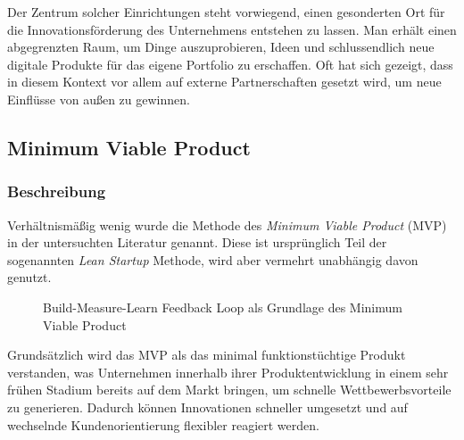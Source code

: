 Der Zentrum solcher Einrichtungen steht vorwiegend, einen gesonderten Ort für die Innovationsförderung des Unternehmens entstehen zu lassen. Man erhält einen abgegrenzten Raum, um Dinge auszuprobieren, Ideen und schlussendlich neue digitale Produkte für das eigene Portfolio zu erschaffen. Oft hat sich gezeigt, dass in diesem Kontext vor allem auf externe Partnerschaften gesetzt wird, um neue Einflüsse von außen zu gewinnen. 

\subsection{Minimum Viable Product}

\subsubsection{Beschreibung}

Verhältnismäßig wenig wurde die Methode des \textit{Minimum Viable Product} (MVP) in der untersuchten Literatur genannt. Diese ist ursprünglich Teil der sogenannten \textit{Lean Startup} Methode, wird aber vermehrt unabhängig davon genutzt.

\begin{figure}[H]
	\centering
	\caption[Build-Measure-Learn Feedback Loop als Grundlage des Minimum Viable Product]{Build-Measure-Learn Feedback Loop als Grundlage des Minimum Viable Product \protect \cite[S. 103]{grote_fuhrungsinstrumente_2018}}
	\label{fig:mvploop}
\end{figure}

Grundsätzlich wird das MVP als das minimal funktionstüchtige Produkt verstanden, was Unternehmen innerhalb ihrer Produktentwicklung in einem sehr frühen Stadium bereits auf dem Markt bringen, um schnelle Wettbewerbsvorteile zu generieren. Dadurch können Innovationen schneller umgesetzt und auf wechselnde Kundenorientierung flexibler reagiert werden. \cite{depiereux_minimum_2019}

